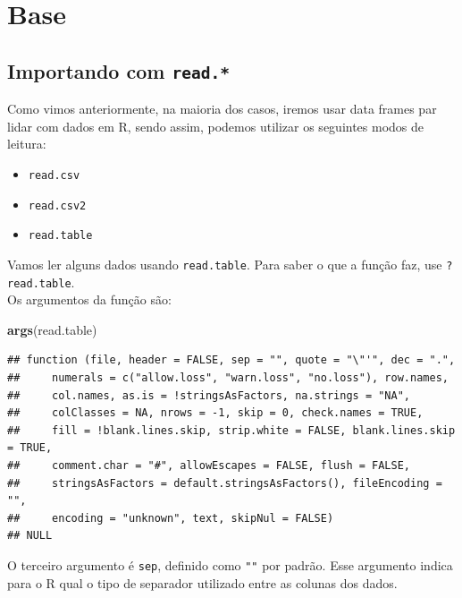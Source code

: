\documentclass[]{book}
\newenvironment{Shaded}{\begin{snugshade}}{\end{snugshade}}
\newcommand{\KeywordTok}[1]{\textcolor[rgb]{0.13,0.29,0.53}{\textbf{#1}}}
\newcommand{\NormalTok}[1]{#1}
\providecommand{\tightlist}{%
  \setlength{\itemsep}{0pt}\setlength{\parskip}{0pt}}
\theoremstyle{definition}
\theoremstyle{definition}
\theoremstyle{definition}
\theoremstyle{remark}
\begin{document}
\section{Base}\label{base}

\subsection{\texorpdfstring{Importando com
\texttt{read.*}}{Importando com read.*}}\label{importando-com-read.}

Como vimos anteriormente, na maioria dos casos, iremos usar data frames
par lidar com dados em R, sendo assim, podemos utilizar os seguintes
modos de leitura:

\begin{itemize}
\tightlist
\item
  \texttt{read.csv}\\
\item
  \texttt{read.csv2}\\
\item
  \texttt{read.table}
\end{itemize}

Vamos ler alguns dados usando \texttt{read.table}. Para saber o que a
função faz, use \texttt{?read.table}.\\
Os argumentos da função são:

\begin{Shaded}
\begin{Highlighting}[]
\KeywordTok{args}\NormalTok{(read.table)}
\end{Highlighting}
\end{Shaded}

\begin{verbatim}
## function (file, header = FALSE, sep = "", quote = "\"'", dec = ".", 
##     numerals = c("allow.loss", "warn.loss", "no.loss"), row.names, 
##     col.names, as.is = !stringsAsFactors, na.strings = "NA", 
##     colClasses = NA, nrows = -1, skip = 0, check.names = TRUE, 
##     fill = !blank.lines.skip, strip.white = FALSE, blank.lines.skip = TRUE, 
##     comment.char = "#", allowEscapes = FALSE, flush = FALSE, 
##     stringsAsFactors = default.stringsAsFactors(), fileEncoding = "", 
##     encoding = "unknown", text, skipNul = FALSE) 
## NULL
\end{verbatim}

O terceiro argumento é \texttt{sep}, definido como \texttt{""} por
padrão. Esse argumento indica para o R qual o tipo de separador
utilizado entre as colunas dos dados.
\end{document}
